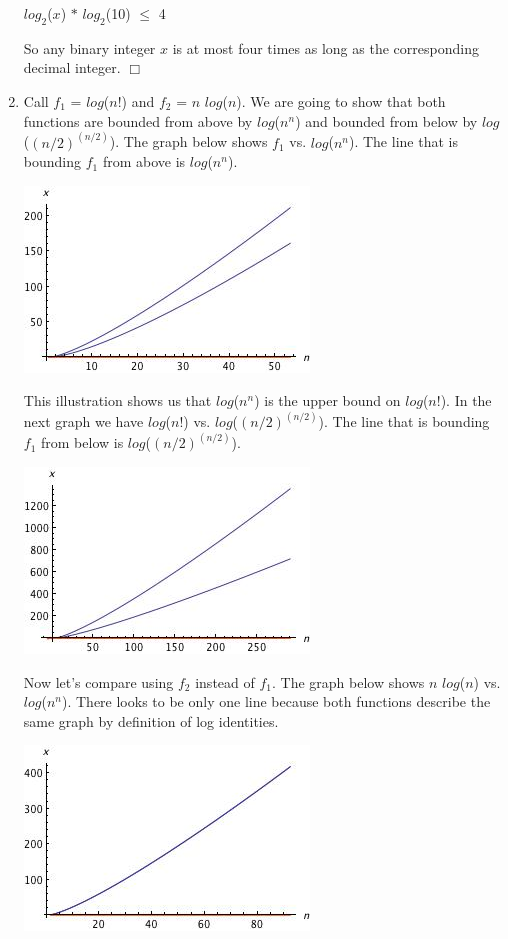 \documentclass[12pt,letterpaper]{article}
\begin{document}
\begin{enumerate}
\begin{center}
      $log_2$(\(x\)) $\ast$ $log_2$(10) $\leq$ 4
      \end{center}
      So any binary integer $x$ is at most four times as long as the 			 	   corresponding decimal integer. $\Box$
    \item
      Call $f_1$ = $log$($n!$) and $f_2$ = $n$ $log$($n$). We are going to show 	  that both functions are bounded from above by $log$($n^n$) and bounded 		  from below by $log$($(n/2)^{(n/2)}$).
      The graph below shows $f_1$ vs. $log$($n^n$). The line that is 	      		  bounding $f_1$ from above is $log$($n^n$).
      \begin{center}
      \includegraphics{Graph3.jpg}
      \end{center}
      This illustration shows us that $log$($n^n$) is the upper bound on 			  $log$($n!$).
      In the next graph we have $log$($n!$) vs. $log$($(n/2)^{(n/2)}$). The line 	   that is bounding $f_1$ from below is $log$($(n/2)^{(n/2)}$).
      \begin{center}
      \includegraphics{Graph2.jpg}
      \end{center}
      Now let's compare using $f_2$ instead of $f_1$. The graph below shows $n$ 	  $log$($n$) vs. $log$($n^n$). There looks to be only one line because both 	  functions describe the same graph by definition of log identities.
      \begin{center}
      \includegraphics{Graph4.jpg}

\end{center}
\end{enumerate}
\end{document}
